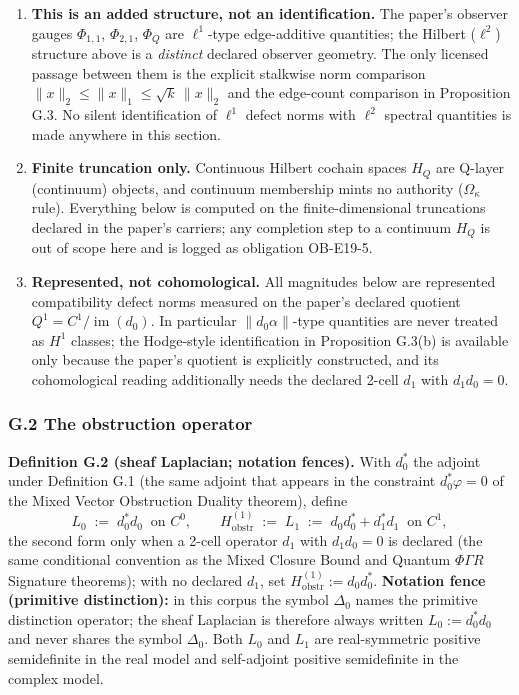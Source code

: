 \documentclass[
  11pt,
]{article}
\providecommand{\tightlist}{%
  \setlength{\itemsep}{0pt}\setlength{\parskip}{0pt}}
\providecommand{\tightlist}{%
  \setlength{\itemsep}{0pt}\setlength{\parskip}{0pt}}
\begin{document}
\begin{enumerate}
\def\labelenumi{\arabic{enumi}.}
\tightlist
\item
  \textbf{This is an added structure, not an identification.} The paper's observer gauges \(\Phi_{1,1}\), \(\Phi_{2,1}\), \(\Phi_Q\) are \(\ell^1\)-type edge-additive quantities; the Hilbert (\(\ell^2\)) structure above is a \emph{distinct} declared observer geometry. The only licensed passage between them is the explicit stalkwise norm comparison \(\|x\|_2\le\|x\|_1\le\sqrt{k}\,\|x\|_2\) and the edge-count comparison in Proposition G.3. No silent identification of \(\ell^1\) defect norms with \(\ell^2\) spectral quantities is made anywhere in this section.
\item
  \textbf{Finite truncation only.} Continuous Hilbert cochain spaces \(H_Q\) are Q-layer (continuum) objects, and continuum membership mints no authority (\(\Omega_\kappa\) rule). Everything below is computed on the finite-dimensional truncations declared in the paper's carriers; any completion step to a continuum \(H_Q\) is out of scope here and is logged as obligation OB-E19-5.
\item
  \textbf{Represented, not cohomological.} All magnitudes below are represented compatibility defect norms measured on the paper's declared quotient \(Q^1=C^1/\operatorname{im}(d_0)\). In particular \(\|d_0\alpha\|\)-type quantities are never treated as \(H^1\) classes; the Hodge-style identification in Proposition G.3(b) is available only because the paper's quotient is explicitly constructed, and its cohomological reading additionally needs the declared 2-cell \(d_1\) with \(d_1d_0=0\).
\end{enumerate}

\subsubsection{G.2 The obstruction operator}\label{g.2-the-obstruction-operator}

\textbf{Definition G.2 (sheaf Laplacian; notation fences).} With \(d_0^*\) the adjoint under Definition G.1 (the same adjoint that appears in the constraint \(d_0^*\varphi=0\) of the Mixed Vector Obstruction Duality theorem), define
\[L_0 \;:=\; d_0^*d_0 \ \text{ on } C^0, \qquad
H^{(1)}_{\mathrm{obstr}} \;:=\; L_1 \;:=\; d_0d_0^* + d_1^*d_1 \ \text{ on } C^1,\]
the second form only when a 2-cell operator \(d_1\) with \(d_1d_0=0\) is declared (the same conditional convention as the Mixed Closure Bound and Quantum \(\Phi\Gamma R\) Signature theorems); with no declared \(d_1\), set \(H^{(1)}_{\mathrm{obstr}}:=d_0d_0^*\). \textbf{Notation fence (primitive distinction):} in this corpus the symbol \(\Delta_0\) names the primitive distinction operator; the sheaf Laplacian is therefore always written \(L_0:=d_0^*d_0\) and never shares the symbol \(\Delta_0\). Both \(L_0\) and \(L_1\) are real-symmetric positive semidefinite in the real model and self-adjoint positive semidefinite in the complex model.
\end{document}
